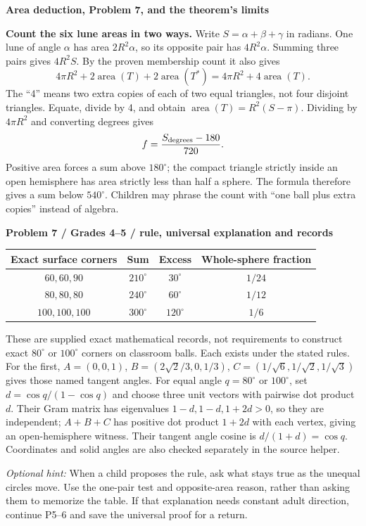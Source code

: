 \documentclass[11pt,letterpaper]{article}
\newcommand{\topic}[1]{\par{\large\bfseries\color{blue}#1}\par}
\newcommand{\sub}[1]{\par\textbf{#1}\par}
\newcommand{\hint}[1]{\textit{Optional hint:} #1\par}
\newcommand{\degc}{^\circ}
\begin{document}
\newpage
\topic{Area deduction, Problem 7, and the theorem's limits}
\textbf{Count the six lune areas in two ways.} Write $S=\alpha+\beta+\gamma$ in radians. One lune of angle $\alpha$ has area $2R^2\alpha$, so its opposite pair has $4R^2\alpha$. Summing three pairs gives $4R^2S$. By the proven membership count it also gives
\[
 4\pi R^2+2\operatorname{area}(T)+2\operatorname{area}(T^*)
 =4\pi R^2+4\operatorname{area}(T).
\]
The ``4'' means two extra copies of each of two equal triangles, not four disjoint triangles. Equate, divide by 4, and obtain $\operatorname{area}(T)=R^2(S-\pi)$. Dividing by $4\pi R^2$ and converting degrees gives
\[
 f=\frac{S_{\rm degrees}-180}{720}.
\]
Positive area forces a sum above $180\degc$; the compact triangle strictly inside an open hemisphere has area strictly less than half a sphere. The formula therefore gives a sum below $540\degc$. Children may phrase the count with ``one ball plus extra copies'' instead of algebra.

\sub{Problem 7 / Grades 4--5 / rule, universal explanation and records}
\begin{center}\begin{tabular}{c|c|c|c}
Exact surface corners & Sum & Excess & Whole-sphere fraction\\\hline
$60,60,90$ & $210\degc$ & $30\degc$ & $1/24$\\
$80,80,80$ & $240\degc$ & $60\degc$ & $1/12$\\
$100,100,100$ & $300\degc$ & $120\degc$ & $1/6$
\end{tabular}\end{center}
These are supplied exact mathematical records, not requirements to construct exact $80\degc$ or $100\degc$ corners on classroom balls. Each exists under the stated rules. For the first, $A=(0,0,1)$, $B=(2\sqrt2/3,0,1/3)$, $C=(1/\sqrt6,1/\sqrt2,1/\sqrt3)$ gives those named tangent angles. For equal angle $q=80\degc$ or $100\degc$, set $d=\cos q/(1-\cos q)$ and choose three unit vectors with pairwise dot product $d$. Their Gram matrix has eigenvalues $1-d,1-d,1+2d>0$, so they are independent; $A+B+C$ has positive dot product $1+2d$ with each vertex, giving an open-hemisphere witness. Their tangent angle cosine is $d/(1+d)=\cos q$. Coordinates and solid angles are also checked separately in the source helper.

\hint{When a child proposes the rule, ask what stays true as the unequal circles move. Use the one-pair test and opposite-area reason, rather than asking them to memorize the table. If that explanation needs constant adult direction, continue P5--6 and save the universal proof for a return.}
\end{document}
